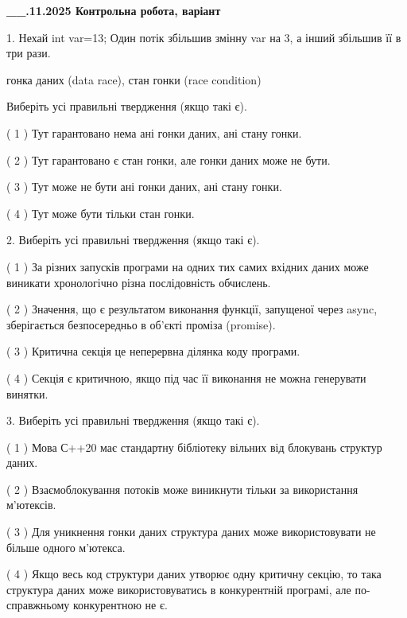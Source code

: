 \documentclass[12pt, ukrainian]{article}
\begin{document}
\newpage
\begin {large}

\textbf{\_\_.11.2025 Контрольна робота, варіант  }\par


{
1. Нехай int var=13; Один потік збільшив змінну var на 3, а інший збільшив її в три рази.

гонка даних (data race), стан гонки (race condition)

Виберіть усі правильні твердження (якщо такі є).\par
\vspace{2mm}
( 1 ) Тут гарантовано нема ані гонки даних, ані стану гонки.%

( 2 ) Тут гарантовано є стан гонки, але гонки даних може не бути.%

( 3 ) Тут може не бути ані гонки даних, ані стану гонки.%

( 4 ) Тут може бути тільки стан гонки.%


2. Виберіть усі правильні твердження (якщо такі є).\par
\vspace{2mm}

( 1 ) За різних запусків програми на одних тих самих вхідних даних може виникати хронологічно різна послідовність обчислень.%

( 2 ) Значення, що є результатом виконання функції, запущеної через async, зберігається безпосередньо в об’єкті проміза (promise).%

( 3 ) Критична секція це неперервна ділянка коду програми.%

( 4 ) Секція є критичною, якщо під час її виконання не можна генерувати винятки.%


3. Виберіть усі правильні твердження (якщо такі є).\par
\vspace{2mm}

( 1 ) Мова С++20 має стандартну бібліотеку вільних від блокувань структур даних.%

( 2 ) Взаємоблокування потоків може виникнути тільки за використання м’ютексів.%

( 3 ) Для уникнення гонки даних структура даних може використовувати не більше одного м’ютекса.%

( 4 ) Якщо весь код структури даних утворює одну критичну секцію, то така структура даних може використовуватись в конкурентній програмі, але по-справжньо\-му конкурентною не є.%


}
\end{large}
\end{document}
